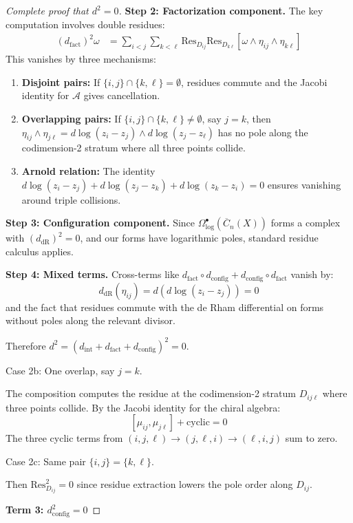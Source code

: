\begin{proof}[Complete proof that $d^2 = 0$]
\textbf{Step 2: Factorization component.}
The key computation involves double residues:
\begin{align}
(d_{\text{fact}})^2\omega &= \sum_{i<j} \sum_{k<\ell} \text{Res}_{D_{ij}} \text{Res}_{D_{k\ell}} [\omega \wedge \eta_{ij} \wedge \eta_{k\ell}]
\end{align}
This vanishes by three mechanisms:
\begin{enumerate}
\item \textbf{Disjoint pairs:} If $\{i,j\} \cap \{k,\ell\} = \emptyset$, residues commute and the Jacobi identity for $\mathcal{A}$ gives cancellation.
\item \textbf{Overlapping pairs:} If $\{i,j\} \cap \{k,\ell\} \neq \emptyset$, say $j = k$, then $\eta_{ij} \wedge \eta_{j\ell} = d\log(z_i - z_j) \wedge d\log(z_j - z_\ell)$ has no pole along the codimension-2 stratum where all three points collide.
\item \textbf{Arnold relation:} The identity $d\log(z_i - z_j) + d\log(z_j - z_k) + d\log(z_k - z_i) = 0$ ensures vanishing around triple collisions.
\end{enumerate}

\textbf{Step 3: Configuration component.}
Since $\Omega^\bullet_{\log}(\overline{C}_n(X))$ forms a complex with $(d_{\text{dR}})^2 = 0$, and our forms have logarithmic poles, standard residue calculus applies.

\textbf{Step 4: Mixed terms.}
Cross-terms like $d_{\text{fact}} \circ d_{\text{config}} + d_{\text{config}} \circ d_{\text{fact}}$ vanish by:
\[
d_{\text{dR}}(\eta_{ij}) = d(d\log(z_i - z_j)) = 0
\]
and the fact that residues commute with the de Rham differential on forms without poles along the relevant divisor.

Therefore $d^2 = (d_{\text{int}} + d_{\text{fact}} + d_{\text{config}})^2 = 0$. \qedhere

Case 2b: One overlap, say $j = k$.

The composition computes the residue at the codimension-2 stratum $D_{ij\ell}$ where three points collide. By the Jacobi identity for the chiral algebra:
$$[\mu_{ij}, \mu_{j\ell}] + \text{cyclic} = 0$$
The three cyclic terms from $(i,j,\ell) \to (j,\ell,i) \to (\ell,i,j)$ sum to zero.

Case 2c: Same pair $\{i,j\} = \{k,\ell\}$.

Then $\text{Res}_{D_{ij}}^2 = 0$ since residue extraction lowers the pole order along $D_{ij}$.

\textbf{Term 3: $d_{\text{config}}^2 = 0$}


\end{proof}
